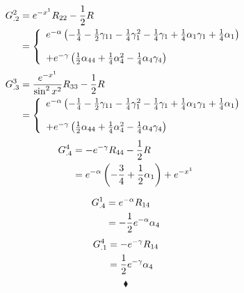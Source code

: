 \begin{align}
G^2_{.2} &= e^{-x^1}R_{22} - \frac{1}{2} R\\
 &= \left\{\begin{array}{l}e^{-\alpha}\left(-\frac{1}{4} - \frac{1}{2} \gamma_{11} - \frac{1}{4} \gamma_{1}^2 -\frac{1}{4} \gamma_{1} + \frac{1}{4}\alpha_1\gamma_1 + \frac{1}{4} \alpha_1\right)\\\\
 +e^{-\gamma}\left( \frac{1}{2} \alpha_{44} +\frac{1}{4} \alpha_{4}^2 - \frac{1}{4}\alpha_4\gamma_4 \right)
 \end{array}\right.
\end{align}
\begin{align}
G^3_{.3} &= \frac{e^{-x^1}}{\sin^2 x^2}R_{33} - \frac{1}{2} R\\
 &= \left\{\begin{array}{l}e^{-\alpha}\left(-\frac{1}{4} - \frac{1}{2} \gamma_{11} - \frac{1}{4} \gamma_{1}^2 -\frac{1}{4} \gamma_{1} + \frac{1}{4}\alpha_1\gamma_1 + \frac{1}{4} \alpha_1\right)\\\\
 +e^{-\gamma}\left( \frac{1}{2} \alpha_{44} +\frac{1}{4} \alpha_{4}^2 - \frac{1}{4}\alpha_4\gamma_4 \right)
 \end{array}\right.
\end{align}
\begin{align}
G^4_{.4} &= -e^{-\gamma}R_{44} - \frac{1}{2} R\\
 &= e^{-\alpha}\left(-\frac{3}{4} + \frac{1}{2} \alpha_1\right)+e^{-x^1}
\end{align}

\begin{align}
G^1_{.4} &= e^{-\alpha}R_{14}\\
 &= -\frac{1}{2} e^{-\alpha} \alpha_4
\end{align}
\begin{align}
G^4_{.1} &=- e^{-\gamma}R_{14}\\
 &= \frac{1}{2} e^{-\gamma} \alpha_4
\end{align}
$$\blacklozenge$$
\newpage